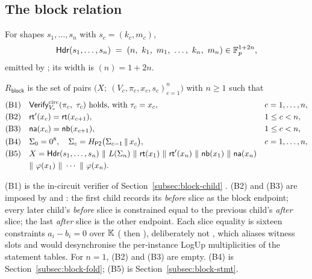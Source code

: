 \subsection{The block relation}
\label{subsec:rblock}

\begin{definition}[Header]
For shapes $s_1,\dots,s_n$ with $s_c=(k_c,m_c)$,
\[
  \mathsf{Hdr}(s_1,\dots,s_n) \;=\; (n,\ k_1,\ m_1,\ \dots,\ k_n,\ m_n) \in \F^{1+2n},
\]
emitted by ; its width is $(n)=1+2n$.
\end{definition}

\begin{definition}
\label{def:rblock}
$R_{\mathsf{block}}$ is the set of pairs
$\big(X;\ (V_c,\pi_c,x_c,s_c)_{c=1}^{n}\big)$ with $n\ge1$ such that
\begin{align}
  &\text{(B1)}\quad \mathsf{Verify}^{\mathrm{circ}}_{V_c}(\pi_c,\ \tau_c)
     \ \text{holds, with } \tau_c = x_c, && c=1,\dots,n, \label{eq:b1}\\
  &\text{(B2)}\quad \mathsf{rt}'(x_c) = \mathsf{rt}(x_{c+1}), && 1\le c<n, \label{eq:b2}\\
  &\text{(B3)}\quad \mathsf{na}(x_c) = \mathsf{nb}(x_{c+1}), && 1\le c<n, \label{eq:b3}\\
  &\text{(B4)}\quad \Sigma_0 = 0^8,\quad \Sigma_c = \Hp\big(\Sigma_{c-1}\,\|\,x_c\big), && c=1,\dots,n, \label{eq:b4}\\
  &\text{(B5)}\quad X = \mathsf{Hdr}(s_1,\dots,s_n)\ \|\ L(\Sigma_n)\ \|\ \mathsf{rt}(x_1)\ \|\ \mathsf{rt}'(x_n)
     \ \|\ \mathsf{nb}(x_1)\ \|\ \mathsf{na}(x_n) \nonumber\\
  &\qquad\quad \|\ \varphi(x_1)\ \|\ \cdots\ \|\ \varphi(x_n). && \label{eq:b5}
\end{align}
\end{definition}

\noindent
(B1) is the in-circuit verifier of Section~\ref{subsec:block-child}
.
(B2) and (B3) are imposed by  and
: the first child records its \emph{before} slice as
the block endpoint; every later child's \emph{before} slice is constrained equal
to the previous child's \emph{after} slice; the last \emph{after} slice is the
other endpoint.
Each slice equality is sixteen constraints $a_i - b_i = 0$ over $\mathbb{K}$
( then ), deliberately not , which
aliases witness slots and would desynchronise the per-instance LogUp
multiplicities of the statement tables.
For $n=1$, (B2) and (B3) are empty. (B4) is Section~\ref{subsec:block-fold};
(B5) is Section~\ref{subsec:block-stmt}.

